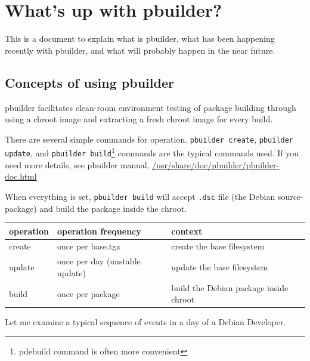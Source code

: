 \documentclass[a4paper]{article}
\begin{document}
\section{What's up with pbuilder?}

This is a document to explain what is pbuilder, what has been happening
recently with pbuilder, and what will probably happen in the near
future.

\subsection{Concepts of using pbuilder}

pbuilder facilitates clean-room environment testing of package building
through using a chroot image and extracting a fresh chroot image for
every build.

There are several simple commands for operation. \texttt{pbuilder
create}, \texttt{pbuilder update}, and \texttt{pbuilder
build}\footnote{pdebuild command is often more convenient} commands are
the typical commands used. If you need more details, see pbuilder
manual, \url{/usr/share/doc/pbuilder/pbuilder-doc.html}

When everything is set, \texttt{pbuilder build} will accept 
\texttt{.dsc} file (the Debian source-package) and build the package
inside the chroot.

\begin{tabular}{|l|l|l|}
\hline
operation & operation frequency & context \\
\hline
create & once per base.tgz & create the base filesystem \\
update & once per day (unstable update) & update the base filesystem \\
build & once per package & build the Debian package inside chroot \\
\hline
\end{tabular}

Let me examine a typical sequence of events in a day of a Debian Developer.

\end{document}
